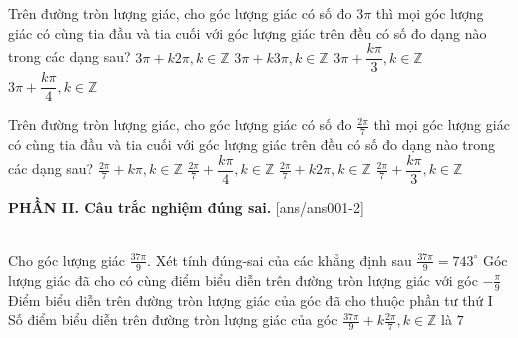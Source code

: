 \documentclass[12pt,a4paper]{article}
\begin{document}
\begin{ex}
 Trên đường tròn lượng giác, cho góc lượng giác có số đo ${3 \pi}$ thì mọi góc lượng giác có cùng tia đầu và tia cuối với góc lượng giác trên đều có số đo dạng nào trong các dạng sau? 
\choice
{ \True $3 \pi+k2\pi, k\in \mathbb{Z}$ }
   { $3 \pi+k3\pi, k\in \mathbb{Z}$ }
     { $3 \pi+\dfrac{k\pi }{3}, k\in \mathbb{Z}$ }
    { $3 \pi+\dfrac{k\pi }{4}, k\in \mathbb{Z}$ }
\end{ex}

\begin{ex}
 Trên đường tròn lượng giác, cho góc lượng giác có số đo ${\frac{2 \pi}{7}}$ thì mọi góc lượng giác có cùng tia đầu và tia cuối với góc lượng giác trên đều có số đo dạng nào trong các dạng sau? 
\choice
{ $\frac{2 \pi}{7}+k\pi, k\in \mathbb{Z}$ }
   { $\frac{2 \pi}{7}+\dfrac{k\pi }{4}, k\in \mathbb{Z}$ }
     { \True $\frac{2 \pi}{7}+k2\pi, k\in \mathbb{Z}$ }
    { $\frac{2 \pi}{7}+\dfrac{k\pi }{3}, k\in \mathbb{Z}$ }
\end{ex}

{\bf PHẦN II. Câu trắc nghiệm đúng sai.}
\setcounter{ex}{0}
[ans/ans001-2]
\begin{ex}\\
 Cho góc lượng giác $\frac{37 \pi}{9}$. Xét tính đúng-sai của các khẳng định sau
\choiceTFt
{ $\frac{37 \pi}{9}=743^\circ$  }
   { Góc lượng giác đã cho có cùng điểm biểu diễn trên đường tròn lượng giác với góc $- \frac{\pi}{9}$  }
     { \True Điểm biểu diễn trên đường tròn lượng giác của góc đã cho thuộc phần tư thứ I }
    { \True Số điểm biểu diễn trên đường tròn lượng giác của góc $\frac{37 \pi}{9}+k\frac{2 \pi}{7},k \in \mathbb{Z}$ là ${7}$ }
\end{ex}
\end{document}
